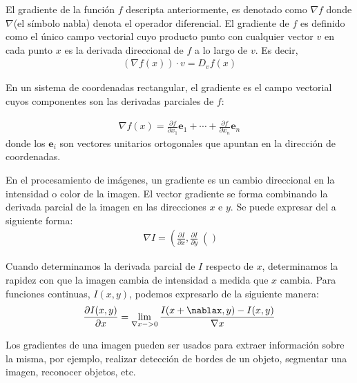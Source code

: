 	El gradiente de la función $f$ descripta anteriormente, es denotado como $\nabla f$ donde $\nabla$(el símbolo nabla) denota el operador diferencial. El gradiente de $f$ es definido como el único campo vectorial cuyo producto punto con cualquier vector $v$ en cada punto $x$ es la derivada direccional de $f$ a lo largo de $v$. Es decir,
		 \begin{align*}
		 	(\nabla f(x))\cdot v = D_v f(x)
		 \end{align*}
		 
	En un sistema de coordenadas rectangular, el gradiente es el campo vectorial cuyos componentes son las derivadas parciales de $f$:
		 
		 \begin{align*}
		 	\nabla f(x) = \frac{\partial f}{\partial x_1}\mathbf{e}_1 + \cdots + \frac{\partial f}{\partial x_n }\mathbf{e}_n
		 \end{align*}
	donde los $\mathbf{e}_i$ son vectores unitarios ortogonales que apuntan en la dirección de coordenadas.

	En el procesamiento de imágenes, un gradiente es un cambio direccional en la intensidad o color de la imagen. El vector gradiente se forma combinando la derivada parcial de la imagen en las direcciones $x$ e $y$. Se puede expresar del a siguiente forma:
		\begin{align}
			\nabla I = \left( \frac{\partial I}{\partial x} , \frac{\partial I}{\partial y} \right()
		\end{align}	
		
	Cuando determinamos la derivada parcial de $I$ respecto de $x$, determinamos la rapidez con que la imagen cambia de intensidad a medida que $x$ cambia. Para funciones continuas, $I(x,y)$, podemos expresarlo de la siguiente manera:
	\begin{align}
		\frac{\partial I(x,y)}{\partial x} = \lim_{\nabla x->0} \frac{I(x + \nablax, y) - I(x,y)}{\nabla x}	
	\end{align}
	
	 Los gradientes de una imagen pueden ser usados para extraer información sobre la misma, por ejemplo, realizar detección de bordes de un objeto, segmentar una imagen, reconocer objetos, etc.
